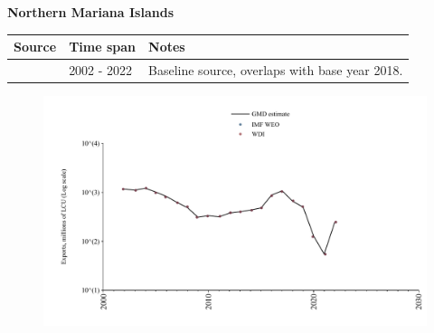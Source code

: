 \documentclass[12pt,a4paper,landscape]{article}
\begin{document}
\begin{adjustbox}{max totalsize={\paperwidth}{\paperheight},center}
\begin{minipage}[t][\textheight][t]{\textwidth}
\vspace*{0.5cm}
{}
\begin{center}
{\Large\bfseries Northern Mariana Islands}
\end{center}
\vspace{0.5cm}
\begin{table}[H]
\centering
\small
\begin{tabular}{|l|l|l|}
\hline
\textbf{Source} & \textbf{Time span} & \textbf{Notes} \\
\hline
\rowcolor{white}\cite{WDI}& 2002 - 2022 &Baseline source, overlaps with base year 2018.\\
\hline
\end{tabular}
\end{table}
\begin{figure}[H]
\centering
\includegraphics[width=\textwidth,height=0.6\textheight,keepaspectratio]{graphs/MNP_exports.pdf}
\end{figure}
\end{minipage}
\end{adjustbox}
\end{document}
